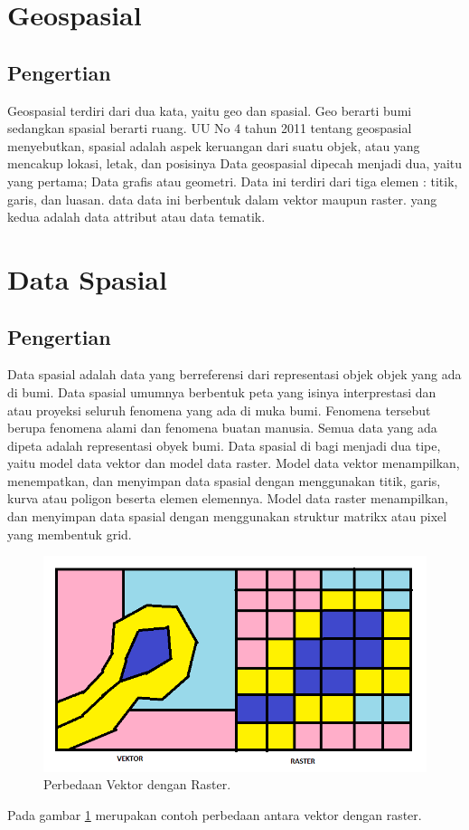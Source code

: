\section{Geospasial}
\subsection{Pengertian}
Geospasial terdiri dari dua kata, yaitu geo dan spasial. Geo berarti bumi sedangkan spasial berarti 
ruang. UU No 4 tahun 2011 tentang geospasial menyebutkan, spasial adalah aspek keruangan dari suatu objek, 
atau yang mencakup lokasi, letak, dan posisinya
Data geospasial dipecah menjadi dua, yaitu yang pertama; Data grafis atau geometri. Data ini terdiri dari
tiga elemen : titik, garis, dan luasan. data data ini berbentuk dalam vektor maupun raster. yang kedua
adalah data attribut atau data tematik.

\section{Data Spasial}
\subsection{Pengertian}
Data spasial adalah data yang berreferensi dari representasi objek objek yang ada di bumi.
Data spasial umumnya berbentuk peta yang isinya interprestasi dan atau proyeksi seluruh 
fenomena yang ada di muka bumi. Fenomena tersebut berupa fenomena alami dan fenomena 
buatan manusia. Semua data yang ada dipeta adalah representasi obyek bumi.
Data spasial di bagi menjadi dua tipe, yaitu model data vektor dan model data raster. 
Model data vektor menampilkan, menempatkan, dan menyimpan data spasial dengan menggunakan 
titik, garis, kurva atau poligon beserta elemen elemennya. Model data raster menampilkan,
dan menyimpan data spasial dengan menggunakan struktur matrikx atau pixel yang membentuk grid.

\begin{figure}[ht]
	\centerline{\includegraphics[width=1\textwidth]{figures/vektorraster.PNG}}
	\caption{Perbedaan Vektor dengan Raster.}
	\label{vektorraster}
	\end{figure}
Pada gambar \ref{vektorraster} merupakan contoh perbedaan antara vektor dengan raster.

